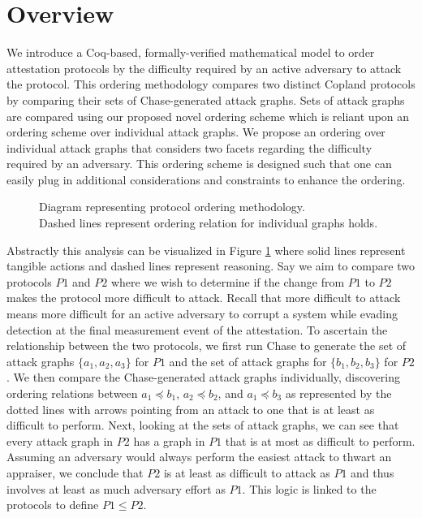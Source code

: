 \documentclass[runningheads]{llncs}
\theoremstyle{definition}
\begin{document}
\section{Overview}
We introduce a Coq-based, formally-verified mathematical model to order attestation protocols by the difficulty required by an active adversary to attack the protocol. This ordering methodology compares two distinct Copland protocols by comparing their sets of Chase-generated attack graphs. Sets of attack graphs are compared using our proposed novel ordering scheme which is reliant upon an ordering scheme over individual attack graphs. We propose an ordering over individual attack graphs that considers two facets regarding the difficulty required by an adversary. This ordering scheme is designed such that one can easily plug in additional considerations and constraints to enhance the ordering.

\begin{figure}[hbtp]
    \centering
    \captionsetup{justification=centering,margin=1cm}
    
    \caption[Protocol ordering abstraction]{Diagram representing protocol ordering methodology. \\ Dashed lines represent ordering relation for individual graphs holds. }
    \label{fig:protocol-org-fig}
\end{figure}

Abstractly this analysis can be visualized in Figure \ref{fig:protocol-org-fig} where solid lines represent tangible actions and dashed lines represent reasoning. Say we aim to compare two protocols $P1$ and $P2$ where we wish to determine if the change from $P1$ to $P2$ makes the protocol more difficult to attack. Recall that more difficult to attack means more difficult for an active adversary to corrupt a system while evading detection at the final measurement event of the attestation. To ascertain the relationship between the two protocols, we first run Chase to generate the set of attack graphs $\{ a_1, a_2, a_3\}$ for $P1$ and the set of attack graphs for $\{b_1, b_2, b_3\}$ for $P2$. We then compare the Chase-generated attack graphs individually, discovering ordering relations between $a_1 \preceq b_1$, $a_2 \preceq b_2$, and $a_1 \preceq b_3$ as represented by the dotted lines with arrows pointing from an attack to one that is at least as difficult to perform. Next, looking at the sets of attack graphs, we can see that every attack graph in $P2$ has a graph in $P1$ that is at most as difficult to perform. Assuming an adversary would always perform the easiest attack to thwart an appraiser, we conclude that $P2$ is at least as difficult to attack as $P1$ and thus involves at least as much adversary effort as $P1$. This logic is linked to the protocols to define $ P1 \leq P2$.  
\end{document}

